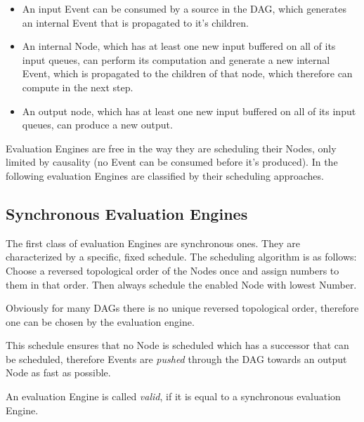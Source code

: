 \begin{itemize}
  \item An input Event can be consumed by a source in the DAG, which generates an internal Event that is propagated to it's children.
  \item An internal Node, which has at least one new input buffered on all of its input queues, can perform
    its computation and generate a new internal Event, which is propagated to the children of that node, which therefore can compute in the next step.
  \item An output node, which has at least one new input buffered on all of its input queues, can produce a new output.
\end{itemize}

Evaluation Engines are free in the way they are scheduling their Nodes, only limited by causality (no Event can be consumed before it's produced).
In the following evaluation Engines are classified by their scheduling approaches.

\subsection{Synchronous Evaluation Engines}
\label{sec:concepts:behaviour_without_timing:synchronous}

The first class of evaluation Engines are synchronous ones.
They are characterized by a specific, fixed schedule.
The scheduling algorithm is as follows: Choose a reversed topological order of the Nodes once and assign numbers to them in that order.
Then always schedule the enabled Node with lowest Number.

Obviously for many DAGs there is no unique reversed topological order, therefore one can be chosen by the evaluation engine.

This schedule ensures that no Node is scheduled which has a successor that can be scheduled, therefore Events are \emph{pushed} through the DAG towards an output Node as fast as possible.

\begin{definition}[name = Equality of evaluation Engines]\label{def:valid_eval_engine}
  An evaluation Engine is called \emph{valid}, if it is equal to a synchronous evaluation Engine.
\end{definition}


